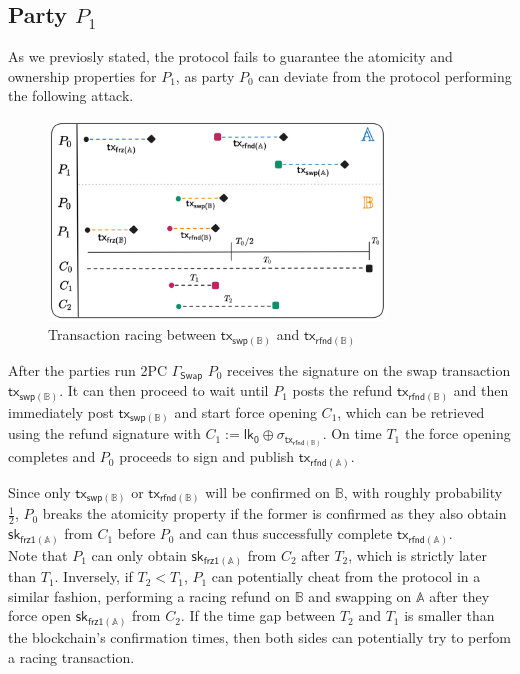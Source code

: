 \documentclass{article}      	%
\begin{document}
\subsection{Party $P_1$}
As we previosly stated, the protocol fails to guarantee the atomicity and ownership properties for $P_1$, as party $P_0$ can deviate from the protocol performing the following attack. \\
\begin{figure}[H]
    \centering
    \includegraphics[width=0.8\textwidth]{timeouts.png}
    \caption{Transaction racing between  $\mathsf{tx_{swp(\mathbb{B})}}$ and $\mathsf{tx_{rfnd(\mathbb{B})}}$}
\end{figure}
After the parties run 2PC $\Gamma_{\mathsf{Swap}}$ $P_0$ receives the signature on the swap transaction $\mathsf{tx_{swp(\mathbb{B})}}$. It can then proceed to wait until $P_1$ posts the refund $\mathsf{tx_{rfnd(\mathbb{B})}}$ and then immediately post $\mathsf{tx_{swp(\mathbb{B})}}$ and start force opening $C_1$, which can be retrieved using the refund signature with $C_1 := \mathsf{lk_0} \oplus \sigma_{\mathsf{tx_{rfnd(\mathbb{B})}}}$. On time $T_1$ the force opening completes and $P_0$ proceeds to sign and publish $\mathsf{tx_{rfnd(\mathbb{A})}}$.

Since only $\mathsf{tx_{swp(\mathbb{B})}}$ or $\mathsf{tx_{rfnd(\mathbb{B})}}$ will be confirmed on $\mathbb{B}$, with roughly probability $\frac{1}{2}$, $P_0$ breaks the atomicity property if the former is confirmed as they also obtain $\mathsf{sk_{frz1(\mathbb{A})}}$ from $C_1$ before $P_0$ and can thus successfully complete $\mathsf{tx_{rfnd(\mathbb{A})}}$. \\
Note that $P_1$ can only obtain $\mathsf{sk_{frz1(\mathbb{A})}}$ from $C_2$ after $T_2$, which is strictly later than $T_1$. Inversely, if $T_2 < T_1$, $P_1$ can potentially cheat from the protocol in a similar fashion, performing a racing refund on $\mathbb{B}$ and swapping on $\mathbb{A}$ after they force open $\mathsf{sk_{frz1(\mathbb{A})}}$ from $C_2$. If the time gap between $T_2$ and $T_1$ is smaller than the blockchain's confirmation times, then both sides can potentially try to perfom a racing transaction.
\end{document}
